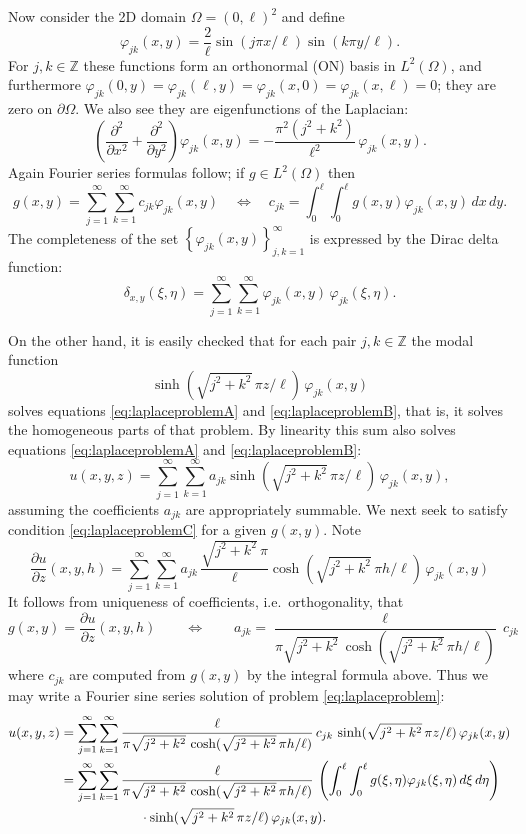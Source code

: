 \documentclass[letterpaper,final,12pt,reqno]{amsart}
\theoremstyle{cstyle}
\theoremstyle{cstyle*}
\theoremstyle{dstyle}
\numberwithin{equation}{section}
\newcommand{\ZZ}{\mathbb{Z}}
\begin{document}
Now consider the 2D domain $\Omega = (0,\ell)^2$ and define
    $$\varphi_{jk}(x,y) = \frac{2}{\ell} \sin(j\pi x/\ell) \sin(k\pi y/\ell).$$
For $j,k \in \ZZ$ these functions form an orthonormal (ON) basis in $L^2(\Omega)$, and furthermore $\varphi_{jk}(0,y)=\varphi_{jk}(\ell,y)=\varphi_{jk}(x,0)=\varphi_{jk}(x,\ell)=0$; they are zero on $\partial\Omega$.  We also see they are eigenfunctions of the Laplacian:
    $$\left(\frac{\partial^2}{\partial x^2} + \frac{\partial^2}{\partial y^2}\right) \varphi_{jk}(x,y) = - \frac{\pi^2 (j^2+k^2)}{\ell^2}\, \varphi_{jk}(x,y).$$
Again Fourier series formulas follow; if $g\in L^2(\Omega)$ then
    $$g(x,y) = \sum_{j=1}^\infty \sum_{k=1}^\infty c_{jk} \varphi_{jk}(x,y) \quad \iff \quad c_{jk} = \int_0^\ell \int_0^\ell g(x,y) \varphi_{jk}(x,y)\,dx\,dy.$$
The completeness of the set $\left\{\varphi_{jk}(x,y)\right\}_{j,k=1}^\infty$ is expressed by the Dirac delta function:
\begin{equation}
    \delta_{x,y}(\xi,\eta) = \sum_{j=1}^\infty \sum_{k=1}^\infty \varphi_{jk}(x,y) \, \varphi_{jk}(\xi,\eta). \label{eq:app:diracdelta}
\end{equation}

On the other hand, it is easily checked that for each pair $j,k \in \ZZ$ the modal function
    $$\sinh(\sqrt{j^2+k^2}\, \pi z/\ell) \, \varphi_{jk}(x,y)$$
solves equations \eqref{eq:laplaceproblemA} and \eqref{eq:laplaceproblemB}, that is, it solves the homogeneous parts of that problem.  By linearity this sum also solves equations \eqref{eq:laplaceproblemA} and \eqref{eq:laplaceproblemB}:
    $$u(x,y,z) = \sum_{j=1}^\infty \sum_{k=1}^\infty a_{jk} \sinh(\sqrt{j^2+k^2}\, \pi z/\ell)\, \varphi_{jk}(x,y),$$
assuming the coefficients $a_{jk}$ are appropriately summable.  We next seek to satisfy condition \eqref{eq:laplaceproblemC} for a given $g(x,y)$.  Note
    $$\frac{\partial u}{\partial z}(x,y,h) = \sum_{j=1}^\infty \sum_{k=1}^\infty a_{jk}\,\frac{\sqrt{j^2+k^2}\, \pi}{\ell} \cosh(\sqrt{j^2+k^2}\, \pi h/\ell) \, \varphi_{jk}(x,y)$$
It follows from uniqueness of coefficients, i.e.~orthogonality, that
    $$g(x,y) = \frac{\partial u}{\partial z}(x,y,h) \qquad \iff \qquad a_{jk} = \frac{\ell}{\pi \sqrt{j^2+k^2}\, \cosh(\sqrt{j^2+k^2}\, \pi h/\ell)} \,c_{jk}$$
where $c_{jk}$ are computed from $g(x,y)$ by the integral formula above.  Thus we may write a Fourier sine series solution of problem \eqref{eq:laplaceproblem}:
\begin{align}
u(x,y,z) &= \sum_{j=1}^\infty \sum_{k=1}^\infty \frac{\ell}{\pi \sqrt{j^2+k^2}\, \cosh(\sqrt{j^2+k^2}\, \pi h/\ell)} \,c_{jk} \, \sinh(\sqrt{j^2+k^2}\, \pi z/\ell) \,\varphi_{jk}(x,y) \notag \\
         &= \sum_{j=1}^\infty \sum_{k=1}^\infty \frac{\ell}{\pi \sqrt{j^2+k^2}\, \cosh(\sqrt{j^2+k^2}\, \pi h/\ell)} \,\left(\int_0^\ell \int_0^\ell g(\xi,\eta) \varphi_{jk}(\xi,\eta)\,d\xi\,d\eta\right) \notag \\
         &\qquad\qquad\qquad \cdot \sinh(\sqrt{j^2+k^2}\, \pi z/\ell) \, \varphi_{jk}(x,y). \label{eq:app:laplaceproblemsoln}
\end{align}
\end{document}
